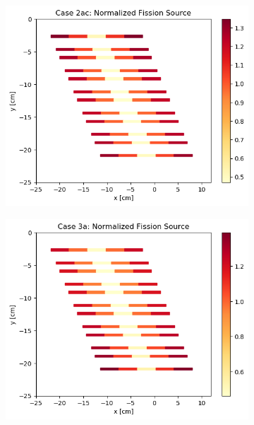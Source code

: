 \documentclass[letterpaper,11pt]{report}
\begin{document}
\begin{figure}[H]
\begin{subfigure}{.33\textwidth}
        \caption{}
      \end{subfigure}
      \begin{subfigure}{.33\textwidth}
        \centering
        \includegraphics[width=\linewidth]{../../phase1a/case2ac/analysis_output/p1a_2ac_c.png}
        \caption{}
      \end{subfigure}
      \begin{subfigure}{.33\textwidth}
        \centering
        \includegraphics[width=\linewidth]{../../phase1a/case3a/analysis_output/p1a_3a_c.png}
        \caption{}
      \end{subfigure}

\end{figure}
\end{document}
